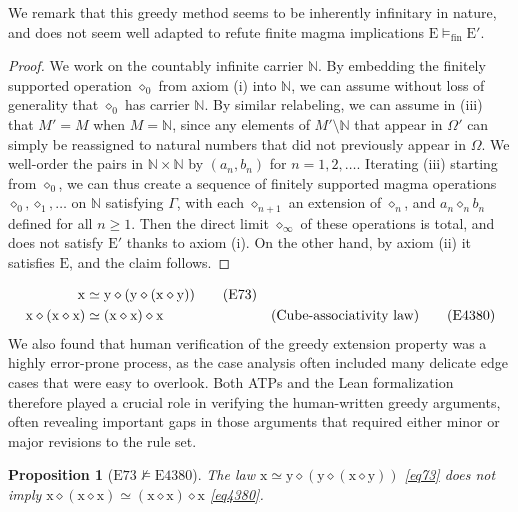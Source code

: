 \documentclass[10pt,a4paper]{amsart}
\newtheorem{proposition}{Proposition}
\newcommand{\E}{\mathrm{E}}
\newcommand{\N}{\mathbb{N}}
\newcommand{\Eq}[1]{\mathrm{E}#1}
\newcommand{\formaleq}{\simeq}
\newcommand{\nmodels}{\not\models}
\newcommand{\op}{\diamond}
\newcommand{\x}{\mathrm{x}}
\newcommand{\y}{\mathrm{y}}
\newcommand{\modelsfin}{\models_{\mathrm{fin}}}
\begin{document}
We remark that this greedy method seems to be inherently infinitary in nature, and does not seem well adapted to refute finite magma implications $\E \modelsfin {\E'}$.

\begin{proof}  We work on the countably infinite carrier $\N$.  By embedding the finitely supported operation $\op_0$ from axiom (i) into $\N$, we can assume without loss of generality that $\op_0$ has carrier $\N$.  By similar relabeling, we can assume in (iii) that $M' = M$ when $M=\N$, since any elements of $M' \setminus \N$ that
appear in $\Omega'$ can simply be reassigned to natural numbers that did not previously appear in $\Omega$.  We well-order the pairs in $\N \times \N$ by $(a_n,b_n)$ for $n=1,2,\dots$.  Iterating (iii) starting from $\op_0$, we can thus create a sequence of finitely supported magma operations $\op_0, \op_1, \dots$ on $\N$ satisfying $\Gamma$, with each $\op_{n+1}$ an extension of $\op_n$, and $a_n \op_n b_n$ defined for all $n \geq 1$.  Then the direct limit $\op_\infty$ of these operations is total, and does not satisfy ${\E'}$ thanks to axiom (i).  On the other hand, by axiom (ii) it satisfies $\E$, and the claim follows.
\end{proof}

\begin{align*}
    \x &\formaleq \y \op (\y \op (\x \op \y))  \label{eq73}\tag{E73} \\
        \x \op (\x \op \x) &\formaleq (\x \op \x) \op \x & \hbox{(Cube-associativity law)} \label{eq4380}\tag{E4380} \\
\end{align*}
We also found that human verification of the greedy extension property was a highly error-prone process, as the case analysis often included many delicate edge cases that were easy to overlook.  Both ATPs and the Lean formalization therefore played a crucial role in verifying the human-written greedy arguments, often revealing important gaps in those arguments that required either minor or major revisions to the rule set.

\begin{proposition}[$\Eq{73} \nmodels \Eq{4380}$]\label{73-4380} The law $\x \formaleq \y \op (\y \op (\x \op \y))$ \eqref{eq73} does not imply $\x \op (\x \op \x) \formaleq (\x \op \x) \op \x$ \eqref{eq4380}.
\end{proposition}
\end{document}
